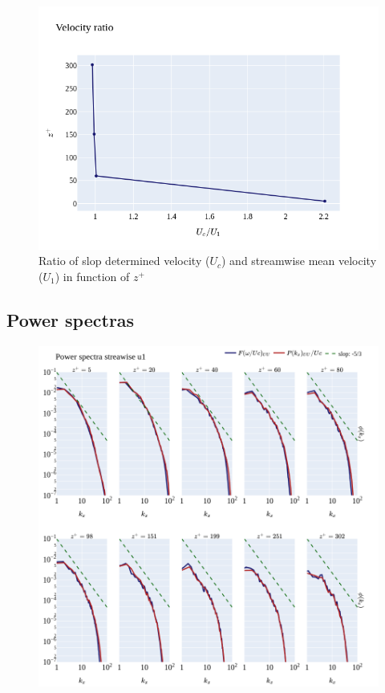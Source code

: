 \documentclass[]{article}
\theoremstyle{plain}
\theoremstyle{remark}
\begin{document}
\begin{figure}[H]
	\begin{center}
		\includegraphics[width=\textwidth]{../../output/figures/channel_wrles_retau395/split_time/frozen_turbulence/correlation2D/u_ratio.png}
		\caption{Ratio of slop determined velocity ($U_c$) and streamwise mean velocity ($U_1$) in function of $z^+$}
	\end{center}
\end{figure}


\subsection{Power spectras}

\begin{figure}[H]
	\begin{center}
		\includegraphics[width=\textwidth]{../../output/figures/channel_wrles_retau395/split_time/frozen_turbulence/power_spectra/u1_all.png}
	\end{center}
\end{figure}
\end{document}

